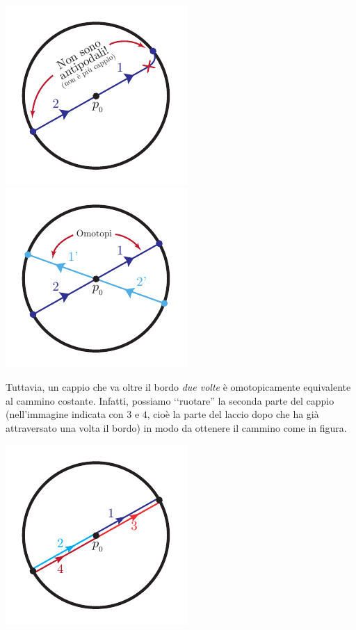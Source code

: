 \begin{itemize}
\begin{itemize}
\begin{center}
				\includegraphics[trim=0cm 0cm 0cm 0cm,clip,scale=0.95]{images/projdiscoverborder2.pdf}
				\includegraphics[trim=0cm 0cm 0cm 0cm,clip,scale=0.95]{images/projdiscoverborder3.pdf}
			\end{center}
		\end{itemize}
		Tuttavia, un cappio che va oltre il bordo \textit{due volte} è omotopicamente equivalente al cammino costante. Infatti, possiamo ‘‘ruotare'' la seconda parte del cappio (nell'immagine indicata con $3$ e $4$, cioè la parte del laccio dopo che ha già attraversato una volta il bordo) in modo da ottenere il cammino come in figura.
		\begin{center}
			\includegraphics[trim=0cm 0cm 0cm 0cm,clip,scale=0.95]{images/projdiscdouble1.pdf}

\end{center}
\end{itemize}
